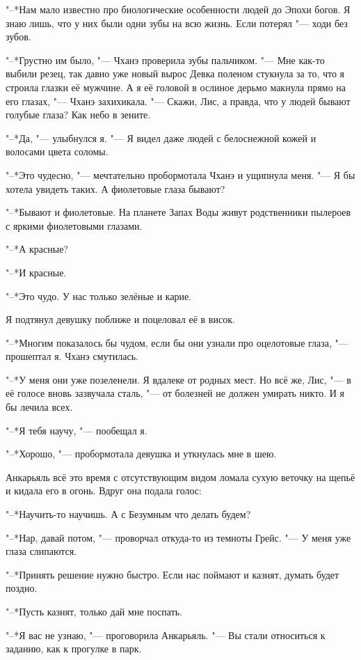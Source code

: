 \documentclass[a4paper,10pt,fleqn]{book}
\newcommand{\ldotst}{\so{...}\xspace}
\begin{document}
"--*Нам мало известно про биологические особенности людей до Эпохи богов.
Я знаю лишь, что у них были одни зубы на всю жизнь.
Если потерял "--- ходи без зубов.

"--*Грустно им было, "--- Чханэ проверила зубы пальчиком.
"--- Мне как-то выбили резец, так давно уже новый вырос\ldotst
Девка поленом стукнула за то, что я строила глазки её мужчине.
А я её головой в ослиное дерьмо макнула\ldotst прямо на его глазах, "--- Чханэ захихикала.
"--- Скажи, Лис, а правда, что у людей бывают голубые глаза?
Как небо в зените.

"--*Да, "--- улыбнулся я.
"--- Я видел даже людей с белоснежной кожей и волосами цвета соломы.

"--*Это чудесно, "--- мечтательно пробормотала Чханэ и ущипнула меня.
"--- Я бы хотела увидеть таких.
А фиолетовые глаза бывают?

"--*Бывают и фиолетовые.
На планете Запах Воды живут родственники пылероев с яркими фиолетовыми глазами.

"--*А красные?

"--*И красные.

"--*Это чудо.
У нас только зелёные и карие.

Я подтянул девушку поближе и поцеловал её в висок.

"--*Многим показалось бы чудом, если бы они узнали про оцелотовые глаза, "--- прошептал я.
Чханэ смутилась.

"--*У меня они уже позеленели.
Я вдалеке от родных мест.
Но всё же, Лис, "--- в её голосе вновь зазвучала сталь, "--- от болезней не должен умирать никто.
И я бы лечила всех.

"--*Я тебя научу, "--- пообещал я.

"--*Хорошо, "--- пробормотала девушка и уткнулась мне в шею.

Анкарьяль всё это время с отсутствующим видом ломала сухую веточку на щепьё и кидала его в огонь.
Вдруг она подала голос:

"--*Научить-то научишь.
А с Безумным что делать будем?

"--*Нар, давай потом, "--- проворчал откуда-то из темноты Грейс.
"--- У меня уже глаза слипаются.

"--*Принять решение нужно быстро.
Если нас поймают и казнят, думать будет поздно.

"--*Пусть казнят, только дай мне поспать.

"--*Я вас не узнаю, "--- проговорила Анкарьяль.
"--- Вы стали относиться к заданию, как к прогулке в парк.
\end{document}
